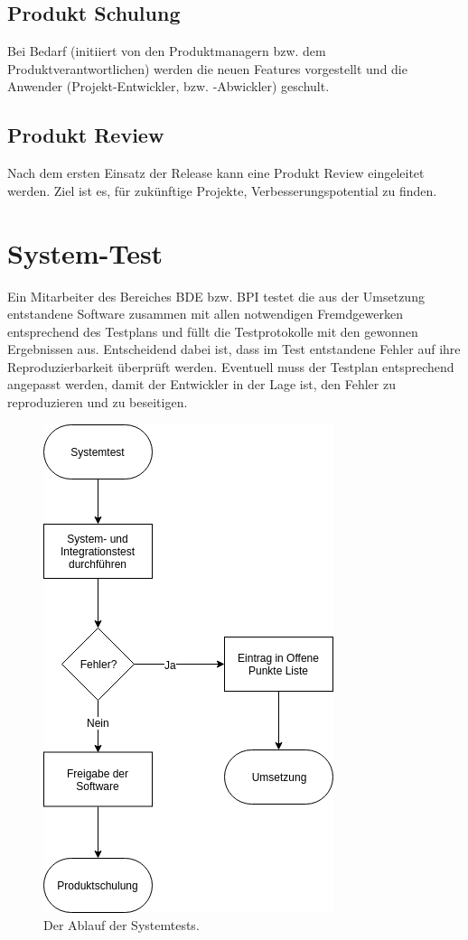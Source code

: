 \subsection{Produkt Schulung}

Bei Bedarf (initiiert von den Produktmanagern bzw. dem Produktverantwortlichen) werden die neuen Features vorgestellt und die Anwender (Projekt-Entwickler, bzw. -Abwickler) geschult.

\subsection{Produkt Review}
Nach dem ersten Einsatz der Release kann eine Produkt Review eingeleitet werden. Ziel ist es, für zukünftige Projekte, Verbesserungspotential zu finden.

\section{System-Test}

Ein Mitarbeiter des Bereiches \ac{BDE} bzw. \ac{BPI} testet die aus der Umsetzung entstandene Software zusammen mit allen notwendigen Fremdgewerken entsprechend des Testplans und füllt die Testprotokolle mit den gewonnen Ergebnissen aus. Entscheidend dabei ist, dass im Test entstandene Fehler auf ihre Reproduzierbarkeit überprüft werden. Eventuell muss der Testplan entsprechend angepasst werden, damit der Entwickler in der Lage ist, den Fehler zu reproduzieren und zu beseitigen.

\begin{figure}[h]
    \centering
    \includegraphics[keepaspectratio,height=0.9\textwidth]{images/3_2_1_5_Systemtest_redraw.png}
    \caption[Systemtest]{Der Ablauf der Systemtests.}
    \label{fig:Produktspezifiktation}
\end{figure}

